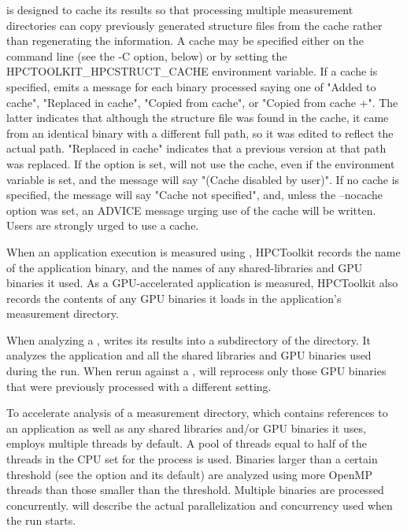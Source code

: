 \documentclass[english]{article}
\begin{document}
 is designed to cache its results so that processing multiple measurement directories
can copy previously generated structure files from the cache rather than regenerating the information.
A cache may be specified either on the command line (see the -C option, below) or
by setting the HPCTOOLKIT_HPCSTRUCT_CACHE environment variable.
If a cache is specified,  emits a message for each binary processed saying one of "Added to cache",
"Replaced in cache", "Copied from cache", or "Copied from cache +".  The latter indicates that although the
structure file was found in the cache, it came from an identical binary with a different full path,
so it was edited to reflect the actual path.
"Replaced in cache" indicates that a previous version at that path was replaced.
If the  option is set,   will not use the cache, even if the environment
variable is set, and the message will say "(Cache disabled by user)".
If no cache is specified, the message will say "Cache not specified",
and, unless the --nocache option was set, an ADVICE message urging use of the cache will be written.
Users are strongly urged to use a cache.

When an application execution is measured using , HPCToolkit records the name of the application binary,
and the names of any shared-libraries and GPU binaries it used. As a GPU-accelerated application is measured,
HPCToolkit also records the contents of any GPU binaries it loads in the application's measurement directory.

When analyzing a ,   writes its results into a subdirectory of the directory.
It analyzes the application and all the shared libraries and GPU binaries used during the run.
When rerun against a ,   will reprocess only those GPU binaries that were
previously processed with a different  setting.

To accelerate analysis of a measurement directory, which contains
references to an application as well as any shared libraries
and/or GPU binaries it uses,  employs multiple threads by
default.  A pool of threads equal to half of the threads in the CPU set for
the process is used.
Binaries larger than a certain threshold (see the  option and
its default) are analyzed using more OpenMP threads than those smaller than
the threshold.
Multiple binaries are processed concurrently.
 will describe the actual parallelization and concurrency
used when the run starts.
\end{document}
